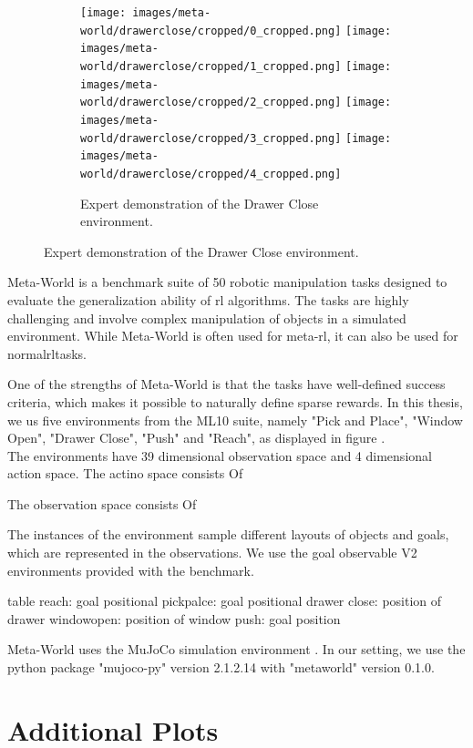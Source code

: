 \begin{figure}[h]
\begin{subfigure}[b]{1\linewidth}
        \label{fig:reach-environment}
    \end{subfigure}
    \begin{subfigure}[b]{1\linewidth}
        \texttt{[image: images/meta-world/drawerclose/cropped/0\_cropped.png]}
        \texttt{[image: images/meta-world/drawerclose/cropped/1\_cropped.png]}
        \texttt{[image: images/meta-world/drawerclose/cropped/2\_cropped.png]}
        \texttt{[image: images/meta-world/drawerclose/cropped/3\_cropped.png]}
        \texttt{[image: images/meta-world/drawerclose/cropped/4\_cropped.png]}
        \caption{Expert demonstration of the Drawer Close environment.}
        \label{fig:reach-environment}
    \end{subfigure}
\end{figure}
  



Meta-World \cite{yu2019meta} is a benchmark suite of 50 robotic manipulation tasks designed to evaluate the generalization ability of \ac{rl} 
algorithms. The tasks are highly challenging and involve complex manipulation of objects in a simulated environment. 
While Meta-World is often used for meta-\ac{rl}, it can also be used for normal\ac{rl}tasks.

One of the strengths of Meta-World is that the tasks have well-defined success criteria, which makes it possible to naturally define sparse rewards. 
In this thesis, we us five environments from the ML10 suite, namely "Pick and Place", "Window Open", "Drawer Close", "Push" and "Reach", as displayed in 
figure . \\

The environments have 39 dimensional observation space and 4 dimensional action space. 
The actino space consists Of


The observation space consists Of


The instances of the environment sample different layouts of objects and goals, which are represented in the observations. We use the 
goal observable V2 environments provided with the benchmark.

table
reach: goal positional
pickpalce: goal positional
drawer close: position of drawer
windowopen: position of window
push: goal position

Meta-World uses the MuJoCo simulation environment \cite{todorov2012mujoco}. In our setting, we use the python package  
"mujoco-py" version 2.1.2.14 with "metaworld" version 0.1.0.   

\chapter{Additional Plots}
\label{chapter:additional_plots}

